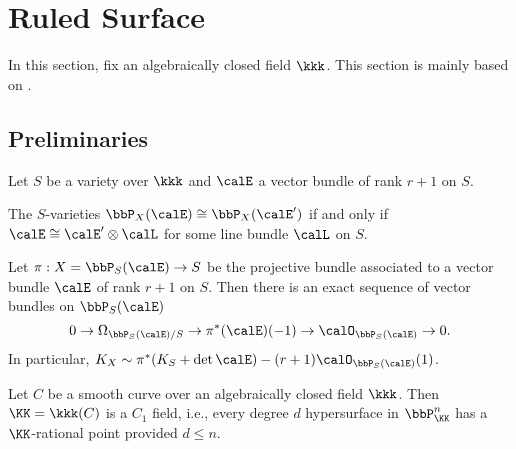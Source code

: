 \section{Ruled Surface}

In this section, fix an algebraically closed field $\kkk$.
This section is mainly based on \cite[Chapter V.2]{Har77}.

\subsection{Preliminaries}

    Let \(S\) be a variety over \(\kkk\) and \(\calE\) a vector bundle of rank \(r+1\) on \(S\).

    \begin{proposition}\label{prop:isomorphic_projective_bundle_iff_twist_by_line_bundle}
        The \(S\)-varieties \(\bbP_X(\calE) \cong \bbP_X(\calE')\) if and only if \(\calE \cong \calE' \otimes \calL\) for some line bundle \(\calL\) on \(S\).
    \end{proposition}

    \begin{theorem}\label{thm:Eulur_sequence_for_projective_bundle}
        Let \(\pi: X=\bbP_S(\calE) \to S\) be the projective bundle associated to a vector bundle \(\calE\) of rank \(r+1\) on \(S\). 
        Then there is an exact sequence of vector bundles on \(\bbP_S(\calE)\)
        \[
            0 \to \Omega_{\bbP_S(\calE)/S} \to \pi^*(\calE)(-1) \to \calO_{\bbP_S(\calE)} \to 0.
        \]
        In particular, \(K_X \sim \pi^*(K_S + \det \calE) - (r+1)\calO_{\bbP_S(\calE)}(1)\).
    \end{theorem}

    \begin{theorem}\label{thm:Tsen_theorem}
        Let \(C\) be a smooth curve over an algebraically closed field \(\kkk\). 
        Then \(\KK=\kkk(C)\) is a \(C_1\) field, i.e., every degree \(d\) hypersurface in \(\bbP^n_{\KK}\) has a \(\KK\)-rational point provided \(d \leq n\).
    \end{theorem}


